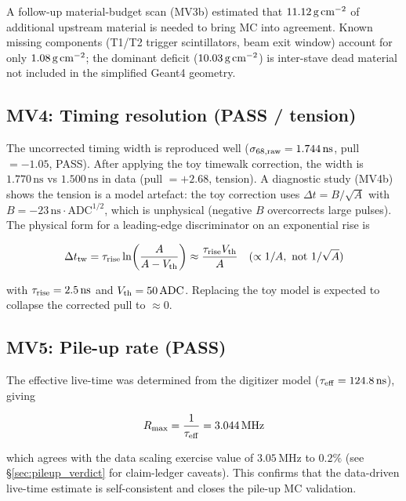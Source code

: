 A follow-up material-budget scan (MV3b) estimated that $11.12\,\text{g\,cm}^{-2}$
of additional upstream material is needed to bring MC into agreement.
Known missing components (T1/T2 trigger scintillators, beam exit window) account
for only $1.08\,\text{g\,cm}^{-2}$; the dominant deficit ($10.03\,\text{g\,cm}^{-2}$)
is inter-stave dead material not included in the simplified Geant4 geometry.

\subsection{MV4: Timing resolution (PASS / tension)}

The uncorrected timing width is reproduced well ($\sigma_{68,\rm raw} = 1.744\,\text{ns}$,
pull $= -1.05$, PASS). After applying the toy timewalk correction,
the width is $1.770\,\text{ns}$ vs $1.500\,\text{ns}$ in data (pull $= +2.68$,
tension). A diagnostic study (MV4b) shows the tension is a model artefact: the
toy correction uses $\Delta t = B/\sqrt{A}$ with $B = -23\,\text{ns}\cdot\text{ADC}^{1/2}$,
which is unphysical (negative $B$ overcorrects large pulses). The physical form for a
leading-edge discriminator on an exponential rise is

\begin{equation}
  \Delta t_{\rm tw} = \tau_{\rm rise}\ln\!\left(\frac{A}{A-V_{\rm th}}\right)
                    \approx \frac{\tau_{\rm rise}V_{\rm th}}{A}
  \quad (\propto 1/A, \text{ not } 1/\sqrt{A})
\end{equation}

\noindent with $\tau_{\rm rise} = 2.5\,\text{ns}$ and $V_{\rm th} = 50\,\text{ADC}$.
Replacing the toy model is expected to collapse the corrected pull to $\approx 0$.

\subsection{MV5: Pile-up rate (PASS)}

The effective live-time was determined from the digitizer model
($\tau_{\rm eff} = 124.8\,\text{ns}$), giving

\begin{equation}
  R_{\max} = \frac{1}{\tau_{\rm eff}} = 3.044\,\text{MHz}
\end{equation}

which agrees with the data scaling exercise value of $3.05\,\text{MHz}$ to
$0.2\%$ (see \S\ref{sec:pileup_verdict} for claim-ledger caveats). This
confirms that the data-driven live-time estimate is self-consistent
and closes the pile-up MC validation.

